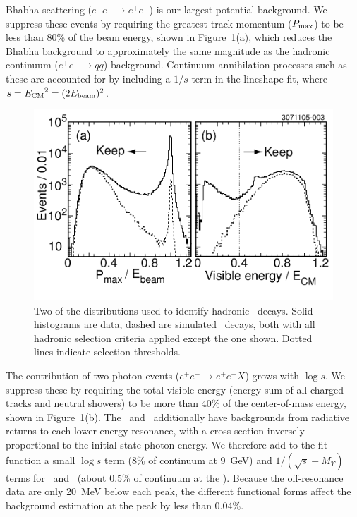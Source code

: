 \documentclass[aps,prl,twocolumn,superscriptaddress,showpacs,floatfix]{revtex4}
\begin{document}
Bhabha scattering ($e^+e^- \to e^+e^-$) is our largest potential
background.  We suppress these events by requiring the greatest track
momentum ($P_{\mbox{\scriptsize max}}$) to be less than 80\% of the
beam energy, shown in Figure~\ref{fig:cuts}(a), which reduces the
Bhabha background to approximately the same magnitude as the hadronic
continuum ($e^+e^- \to q\bar{q}$) background.  Continuum annihilation
processes such as these are accounted for by including a $1/s$ term in
the lineshape fit, where $s = {E_{\mbox{\scriptsize CM}}}^2 = (2
E_{\mbox{\scriptsize beam}})^2$.

\begin{figure}
  \includegraphics[width=\linewidth]{cuts}
  \caption{\label{fig:cuts} Two of the distributions used to identify
hadronic \ups\ decays.  Solid histograms are data, dashed are
simulated \us\ decays, both with all hadronic selection criteria
applied except the one shown.  Dotted lines indicate selection
thresholds.}
\end{figure}

The contribution of two-photon events ($e^+e^- \to e^+e^- X$) grows
with $\log s$.  We suppress these by requiring the total visible
energy (energy sum of all charged tracks and neutral showers) to be
more than 40\% of the center-of-mass energy, shown in
Figure~\ref{fig:cuts}(b).  The \uss\ and \usss\ additionally have
backgrounds from radiative returns to each lower-energy resonance,
with a cross-section inversely proportional to the initial-state
photon energy.  We therefore add to the fit function a small $\log s$
term (8\% of continuum at 9~GeV) and $1/(\sqrt{s}-M_\Upsilon)$ terms
for \us\ and \uss\ (about 0.5\% of continuum at the \usss).  Because
the off-resonance data are only 20~MeV below each peak, the different
functional forms affect the background estimation at the peak by less
than 0.04\%.
\end{document}
